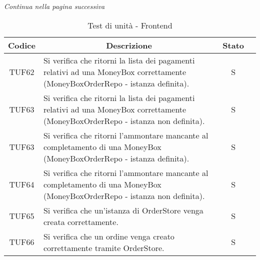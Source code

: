 \begin{center}
  \textit{\small Continua nella pagina successiva}
\end{center}
\begin{table}[H]
  \centering
  \renewcommand{\arraystretch}{1.8}
  \begin{tabular}{c|p{8cm}|c|c}
    \rowcolor[HTML]{125E28}
    \color[HTML]{FFFFFF}\textbf{Codice}
          & \multicolumn{1}{c}{\color[HTML]{FFFFFF}\textbf{Descrizione}}
          & \color[HTML]{FFFFFF}\textbf{Stato}                                                                                                          \\
    \hline
    TUF62 & Si verifica che ritorni la lista dei pagamenti relativi ad una MoneyBox\glo{} correttamente (MoneyBoxOrderRepo - istanza definita).     & S \\
    TUF63 & Si verifica che ritorni la lista dei pagamenti relativi ad una MoneyBox\glo{} correttamente (MoneyBoxOrderRepo - istanza non definita). & S \\
    TUF63 & Si verifica che ritorni l'ammontare mancante al completamento di una MoneyBox\glo{} (MoneyBoxOrderRepo - istanza definita).             & S \\
    TUF64 & Si verifica che ritorni l'ammontare mancante al completamento di una MoneyBox\glo{} (MoneyBoxOrderRepo - istanza non definita).         & S \\
    TUF65 & Si verifica che un'istanza di OrderStore venga creata correttamente.                                                                    & S \\
    TUF66 & Si verifica che un ordine venga creato correttamente tramite OrderStore.                                                                & S \\
  \end{tabular}
  \caption{Test di unità - Frontend}
\end{table}

